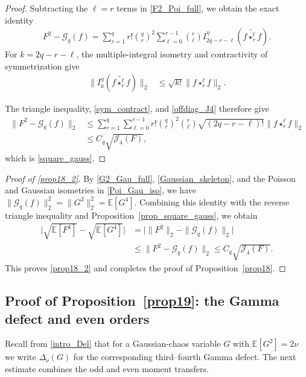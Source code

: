 \documentclass[letterpaper,11pt,reqno]{amsart}
\numberwithin{equation}{section}
\theoremstyle{plain}
\theoremstyle{definition}
\theoremstyle{remark}
\newcommand{\E}{\mathbb{E}}
\newcommand{\cG}{\mathcal{G}}
\newcommand{\noi}{\noindent}
\newcommand{\Jfour}{\mathcal J_4}
\newcommand{\Del}{\Delta}
\newcommand{\wt}{\widetilde}
\begin{document}
\begin{proof}
Subtracting the $\ell=r$ terms in \eqref{F2_Poi_full}, we obtain the
exact identity
\noi
\begin{align*}
 F^2-\cG_q(f)
 =\sum_{r=1}^q r!\binom qr^2
 \sum_{\ell=0}^{r-1}\binom r\ell
 I_{2q-r-\ell}^\eta
 \left( f\wt{\star_r^\ell} f \right).
\end{align*}
For $k=2q-r-\ell$, the multiple-integral isometry and contractivity
of symmetrization give
\noi
\begin{align}
 \|I_k^\eta( f\wt{\star_r^\ell} f )\|_2
 &\leq\sqrt{k!}\|f\star_r^\ell f\|_2.
 \label{sym_contract}
\end{align}

The triangle inequality, \eqref{sym_contract}, and
\eqref{offdiag_J4} therefore give
\begin{align*}
 \|F^2-\cG_q(f)\|_2
 &\leq
 \sum_{r=1}^q\sum_{\ell=0}^{r-1}
 r!\binom qr^2\binom r\ell
 \sqrt{(2q-r-\ell)!}
 \|f\star_r^\ell f\|_2\\
 &\leq C_q\sqrt{\Jfour(F)},
\end{align*}
which is \eqref{square_gauss}.
\end{proof}

\begin{proof}[Proof of \eqref{prop18_2}]
By \eqref{G2_Gau_full}, \eqref{Gaussian_skeleton}, and the Poisson and
Gaussian isometries in \eqref{Poi_Gau_iso}, we have
$\|\cG_q(f)\|_2^2=\|G^2\|_2^2=\E[G^4]$.
Combining this identity with the reverse triangle inequality and
Proposition~\ref{prop_square_gauss}, we obtain
\begin{align*}
 \big|\sqrt{\E[F^4]}-\sqrt{\E[G^4]}\big|
 &=\big|\|F^2\|_2-\|\cG_q(f)\|_2\big|\\
 &\leq\|F^2-\cG_q(f)\|_2
 \leq C_q\sqrt{\Jfour(F)}.
\end{align*}
This proves \eqref{prop18_2} and completes the proof of
Proposition~\ref{prop18}.
\end{proof}

\subsection{Proof of Proposition~\ref{prop19}: the Gamma defect and even orders}
\label{SEC_55}

Recall from \eqref{intro_Del} that for a Gaussian-chaos
variable $G$ with $\E[G^2]=2\nu$ we write
$\Del_\nu(G)$ for the corresponding third--fourth Gamma defect.
The next estimate combines the odd and even moment transfers.
\end{document}
